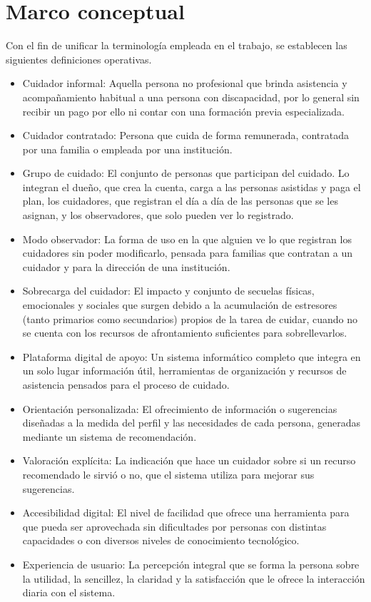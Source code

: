 \section{Marco conceptual}

Con el fin de unificar la terminología empleada en el trabajo, se establecen las siguientes definiciones operativas.

\begin{itemize}
    \item Cuidador informal: Aquella persona no profesional que brinda asistencia y acompañamiento habitual a una persona con discapacidad, por lo general sin recibir un pago por ello ni contar con una formación previa especializada.
    \item Cuidador contratado: Persona que cuida de forma remunerada, contratada por una familia o empleada por una institución.
    \item Grupo de cuidado: El conjunto de personas que participan del cuidado. Lo integran el dueño, que crea la cuenta, carga a las personas asistidas y paga el plan, los cuidadores, que registran el día a día de las personas que se les asignan, y los observadores, que solo pueden ver lo registrado.
    \item Modo observador: La forma de uso en la que alguien ve lo que registran los cuidadores sin poder modificarlo, pensada para familias que contratan a un cuidador y para la dirección de una institución.
    \item Sobrecarga del cuidador: El impacto y conjunto de secuelas físicas, emocionales y sociales que surgen debido a la acumulación de estresores (tanto primarios como secundarios) propios de la tarea de cuidar, cuando no se cuenta con los recursos de afrontamiento suficientes para sobrellevarlos.
    \item Plataforma digital de apoyo: Un sistema informático completo que integra en un solo lugar información útil, herramientas de organización y recursos de asistencia pensados para el proceso de cuidado.
    \item Orientación personalizada: El ofrecimiento de información o sugerencias diseñadas a la medida del perfil y las necesidades de cada persona, generadas mediante un sistema de recomendación.
    \item Valoración explícita: La indicación que hace un cuidador sobre si un recurso recomendado le sirvió o no, que el sistema utiliza para mejorar sus sugerencias.
    \item Accesibilidad digital: El nivel de facilidad que ofrece una herramienta para que pueda ser aprovechada sin dificultades por personas con distintas capacidades o con diversos niveles de conocimiento tecnológico.
    \item Experiencia de usuario: La percepción integral que se forma la persona sobre la utilidad, la sencillez, la claridad y la satisfacción que le ofrece la interacción diaria con el sistema.
\end{itemize}

